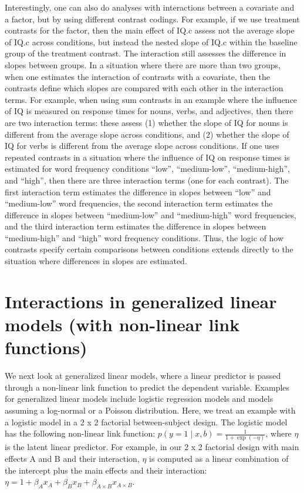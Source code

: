 \documentclass[12pt,]{krantz}
\begin{document}
Interestingly, one can also do analyses with interactions between a covariate and a factor, but by using different contrast codings. For example, if we use treatment contrasts for the factor, then the main effect of IQ.c assess not the average slope of IQ.c across conditions, but instead the nested slope of IQ.c within the baseline group of the treatment contrast. The interaction still assesses the difference in slopes between groups. In a situation where there are more than two groups, when one estimates the interaction of contrasts with a covariate, then the contrasts define which slopes are compared with each other in the interaction terms. For example, when using sum contrasts in an example where the influence of IQ is measured on response times for nouns, verbs, and adjectives, then there are two interaction terms: these assess (1) whether the slope of IQ for nouns is different from the average slope across conditions, and (2) whether the slope of IQ for verbs is different from the average slope across conditions. If one uses repeated contrasts in a situation where the influence of IQ on response times is estimated for word frequency conditions ``low'', ``medium-low'', ``medium-high'', and ``high'', then there are three interaction terms (one for each contrast). The first interaction term estimates the difference in slopes between ``low'' and ``medium-low'' word frequencies, the second interaction term estimates the difference in slopes between ``medium-low'' and ``medium-high'' word frequencies, and the third interaction term estimates the difference in slopes between ``medium-high'' and ``high'' word frequency conditions. Thus, the logic of how contrasts specify certain comparisons between conditions extends directly to the situation where differences in slopes are estimated.

\hypertarget{sec:interactions:NLM}{%
\section{Interactions in generalized linear models (with non-linear link functions)}\label{sec:interactions:NLM}}

We next look at generalized linear models, where a linear predictor is passed through a non-linear link function to predict the dependent variable. Examples for generalized linear models include logistic regression models and models assuming a log-normal or a Poisson distribution. Here, we treat an example with a logistic model in a 2 x 2 factorial between-subject design. The logistic model has the following non-linear link function: \(p(y=1 \mid x, b) = \frac{1}{1 + \exp(-\eta)}\), where \(\eta\) is the latent linear predictor. For example, in our 2 x 2 factorial design with main effects A and B and their interaction, \(\eta\) is computed as a linear combination of the intercept plus the main effects and their interaction: \(\eta = 1 + \beta_A x_A + \beta_B x_B + \beta_{A \times B} x_{A \times B}\).
\end{document}
